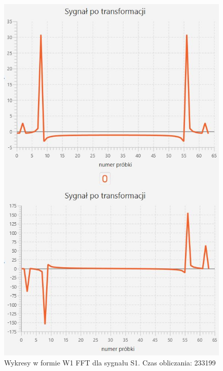 \documentclass[12pt]{article}
\begin{document}
\begin{figure}[H]
	\centering
	\includegraphics[width=.8\linewidth]{FFT-S1-W1}
	\caption{Wykresy w formie W1 FFT dla sygnału S1. Czas obliczania: 233199}
	\label{S3_sygnal}
\end{figure}
\end{document}
